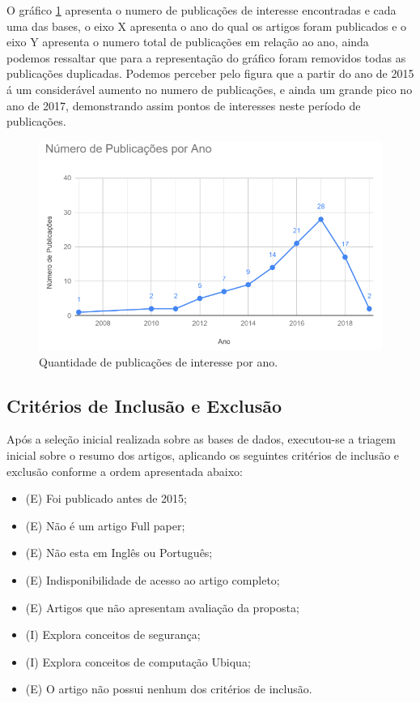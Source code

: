 \documentclass[tid,table]{texufpel} %
\begin{document}
O gráfico \ref{fig:grafPublicaAno} apresenta o numero de publicações de interesse encontradas e cada uma das bases, o eixo X apresenta o ano do qual os artigos foram publicados e o eixo Y apresenta o numero total de publicações em relação ao ano, ainda podemos ressaltar que para a representação do gráfico foram removidos todas as publicações duplicadas. Podemos perceber pelo figura que a partir do ano de 2015 á um considerável aumento no numero de publicações, e ainda um grande pico no ano de 2017, demonstrando assim pontos de interesses neste período de publicações.

\begin{figure}[ht]
	\centering
	\includegraphics[width=.9\textwidth]{imagens/grafPublicaAno.png}
	\caption{Quantidade de publicações de interesse por ano.}
	\label{fig:grafPublicaAno}
\end{figure}

\subsection{Critérios de Inclusão e Exclusão}
Após a seleção inicial realizada sobre as bases de dados, executou-se a triagem inicial sobre o resumo dos artigos, aplicando os seguintes critérios de inclusão e exclusão conforme a ordem apresentada abaixo: 
\begin{itemize}
	\item (E) Foi publicado antes de 2015;
	\item (E) Não é um artigo Full paper;
	\item (E) Não esta em Inglês ou Português;
	\item (E) Indisponibilidade de acesso ao artigo completo;
	\item (E) Artigos que não apresentam avaliação da proposta;
	\item (I) Explora conceitos de segurança;
	\item (I) Explora conceitos de computação Ubiqua;
	\item (E) O artigo não possui nenhum dos critérios de inclusão.
\end{itemize}
	
\end{document}
